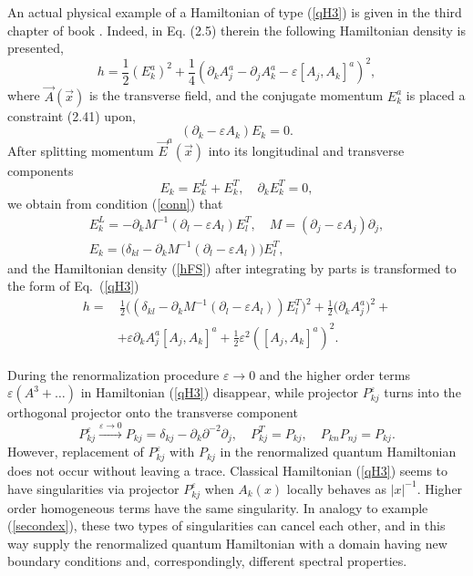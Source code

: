 \documentclass[12pt]{article}
\newcommand{\pl}{\partial}
\newcommand{\ve}{\varepsilon}
\begin{document}
	An actual physical example of a Hamiltonian of type
(\ref{qH3})
	is given in the third chapter of book
\cite{FS}.
	Indeed, in Eq.
(2.5)
	therein the following Hamiltonian density is presented,
\begin{equation}
\label{hFS}
    h = \frac{1}{2} (E_{k}^{a})^{2} + \frac{1}{4}
	(\partial_{k}A_{j}^{a} - \partial_{j}A_{k}^{a}
	    - \ve [A_{j},A_{k}]^{a})^{2} ,
\end{equation}
	where
$ \vec{A}(\vec{x}) $ is the transverse field, and
	the conjugate momentum
$ E_{k}^{a} $
	is placed a constraint (2.41) upon,
\begin{equation}
\label{conn}
    (\partial_{k} - \ve A_{k}) E_{k} = 0 .
\end{equation}
	After splitting momentum
$ \vec{E}^{a}(\vec{x}) $
	into its longitudinal and transverse components
\begin{equation*}
    E_{k} = E_{k}^{L} + E_{k}^{T} ,\quad \partial_{k} E_{k}^{T} = 0,
\end{equation*}
	we obtain from condition
(\ref{conn})
	that
\begin{gather*}
    E_{k}^{L} = - \partial_{k} M^{-1} (\partial_{l} -\ve A_{l}) E_{l}^{T},
    \quad M = (\partial_{j} - \ve A_{j})\partial_{j} , \\
    E_{k} = \bigl(\delta_{kl}
	- \partial_{k} M^{-1} (\partial_{l} -\ve A_{l})\bigr) E_{l}^{T},
\end{gather*}
	and the Hamiltonian density
(\ref{hFS})
	after integrating by parts is transformed to the form of 
Eq.~(\ref{qH3})
\begin{align*}
    h =& \,\frac{1}{2} \bigl( (\delta_{kl}
	- \partial_{k} M^{-1} (\partial_{l} -\ve A_{l}) ) E_{l}^{T} \bigr)^{2}
	+ \frac{1}{2} \bigl( \partial_{k}A_{j}^{a} \bigr)^{2} +\\
	&+ \ve \partial_{k}A_{j}^{a} [A_{j}, A_{k}]^{a}
	+\frac{1}{2} \ve^{2} ([A_{j},A_{k}]^{a})^{2} .
\end{align*}

	During the renormalization procedure
$ \ve \to 0 $
	and the higher order terms
$ \ve (A^{3}+\ldots) $
	in Hamiltonian
(\ref{qH3})
	disappear, while projector
$ P_{kj}^{\ve} $
	turns into the orthogonal projector onto the transverse component
\begin{equation}
\label{Plim}
    P_{kj}^{\ve} \stackrel{\ve\to 0}{\rightarrow}
	P_{kj} = \delta_{kj} - \pl_{k} \pl^{-2} \pl_{j} ,\quad
    P_{kj}^{T} = P_{kj} ,\quad P_{kn} P_{nj} = P_{kj} .
\end{equation}
	However, replacement of
$ P_{kj}^{\ve} $ with $ P_{kj} $
	in the renormalized quantum Hamiltonian does not occur without leaving a trace.
        Classical Hamiltonian
(\ref{qH3})
	seems to have singularities via projector
$ P_{kj}^{\ve} $
	when 
$ A_{k}(x) $
	locally behaves as
$ |x|^{-1} $.
	Higher order homogeneous terms have the same singularity.
	In analogy to example
(\ref{secondex}),
	these two types of singularities can cancel each other,
	and in this way supply the renormalized quantum Hamiltonian
	with a domain having new boundary conditions and, correspondingly,
	different spectral properties.
\end{document}
